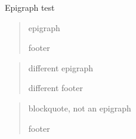 \documentclass{article}
\begin{document}
Epigraph test

\begin{epigraph}

\begin{quote}

epigraph

\begin{blockquotefooter}

footer

\end{blockquotefooter}

\end{quote}

\begin{quote}

different epigraph

\begin{blockquotefooter}

different footer

\end{blockquotefooter}

\end{quote}

\end{epigraph}

\begin{quote}

blockquote, not an epigraph

\begin{blockquotefooter}

footer

\end{blockquotefooter}

\end{quote}
\end{document}
